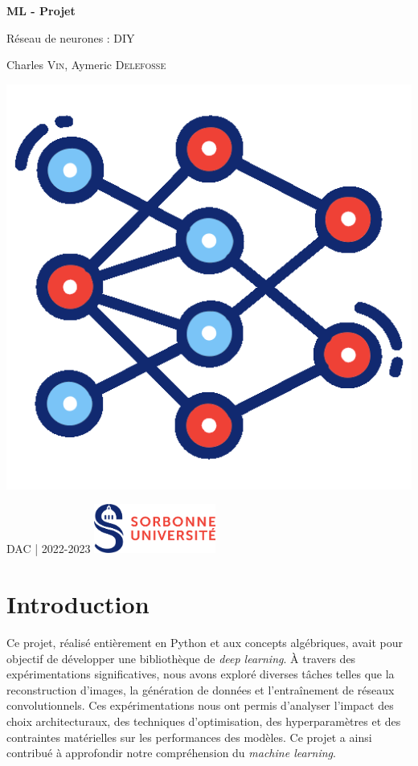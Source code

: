 \documentclass{article}
\begin{document}
\begin{titlepage}
    \begin{center}
        \vspace*{1cm}

        \Huge
        \textbf{ML - Projet}

        \LARGE
        Réseau de neurones : DIY

        \Large
        Charles \textsc{Vin}, Aymeric \textsc{Delefosse}

        \vfill
        \includegraphics[width=.5\textwidth]{neural-network.png}    
        \vfill

        \large
        DAC | 2022-2023 \hfill 
        \includegraphics[width=0.30\textwidth]{logo.png}
        \hfill
        
        
    \end{center}
\end{titlepage}

\tableofcontents
\newpage

\section{Introduction}

Ce projet, réalisé entièrement en Python et aux concepts algébriques, avait pour objectif de développer une bibliothèque de \textit{deep learning}. À travers des expérimentations significatives, nous avons exploré diverses tâches telles que la reconstruction d'images, la génération de données et l'entraînement de réseaux convolutionnels. Ces expérimentations nous ont permis d'analyser l'impact des choix architecturaux, des techniques d'optimisation, des hyperparamètres et des contraintes matérielles sur les performances des modèles. Ce projet a ainsi contribué à approfondir notre compréhension du \textit{machine learning}.
\end{document}
